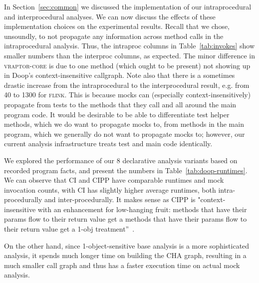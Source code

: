 In Section~\ref{sec:common} we discussed the implementation of our intraprocedural and interprocedural analyses. We can now discuss the effects of these implementation choices on the experimental results. Recall that we chose, unsoundly, to not propagate any information across method calls in the intraprocedural analysis. Thus, the intraproc columns in Table~\ref{tab:invokes} show smaller numbers than the interproc columns, as expected. The minor difference in \textsc{vraptor-core} is due to one method (which ought to be present) not showing up in Doop's context-insensitive callgraph. Note also that there is a sometimes drastic increase from the intraprocedural to the interprocedural result, e.g. from 40 to 1300 for \textsc{flink}. This is because mocks can (especially context-insensitively) propagate from tests to the methods that they call and all around the main program code. It would be desirable to be able to differentiate test helper methods, which we do want to propagate mocks to, from methods in the main program, which we generally do not want to propagate mocks to; however, our current analysis infrastructure treats test and main code identically.



We explored the performance of our 8 declarative analysis variants based on recorded program facts, and present the numbers in Table~\ref{tab:doop-runtimes}. We can observe that CI and CIPP have comparable runtimes and mock invocation counts, with CI has slightly higher average runtimes, both intra-procedurally and inter-procedurally. It makes sense as CIPP is "context-insensitive with an enhancement for low-hanging fruit: methods that have their params flow to their return value get a methods that have their params flow to their return value get a 1-obj treatment”~\cite{yanniss}.

On the other hand, since 1-object-sensitive base analysis is a more sophisticated analysis, it spends much longer time on building the CHA graph, resulting in a much smaller call graph and thus has a faster execution time on actual mock analysis. 

